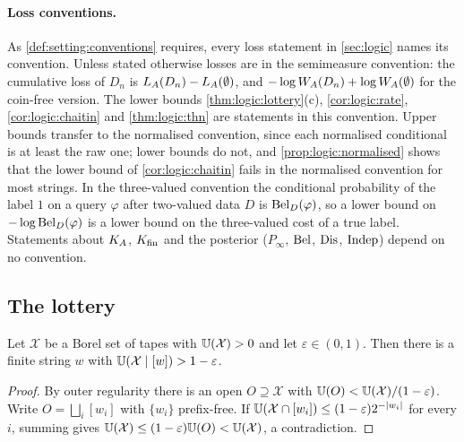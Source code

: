 \paragraph{Loss conventions.} As \cref{def:setting:conventions} requires, every loss statement in \cref{sec:logic} names its convention. Unless stated otherwise losses are in the semimeasure convention: the cumulative loss of $D_n$ is $L_{A}(D_n)-L_{A}(\emptyset)$, and $-\log W_{A}(D_n)+\log W_{A}(\emptyset)$ for the coin-free version. The lower bounds \cref{thm:logic:lottery}(c), \cref{cor:logic:rate}, \cref{cor:logic:chaitin} and \cref{thm:logic:thn} are statements in this convention. Upper bounds transfer to the normalised convention, since each normalised conditional is at least the raw one; lower bounds do not, and \cref{prop:logic:normalised} shows that the lower bound of \cref{cor:logic:chaitin} fails in the normalised convention for most strings. In the three-valued convention the conditional probability of the label $1$ on a query $\varphi$ after two-valued data $D$ is $\mathrm{Bel}_D(\varphi)$, so a lower bound on $-\log\mathrm{Bel}_D(\varphi)$ is a lower bound on the three-valued cost of a true label. Statements about $K_{A}$, $K_{\mathrm{fin}}$ and the posterior ($P_\infty$, $\mathrm{Bel}$, $\mathrm{Dis}$, $\mathrm{Indep}$) depend on no convention.

\subsection{The lottery}\label{app:logic:lottery}

\begin{lemma}\label{lem:logic:density}
Let $\mathcal X$ be a Borel set of tapes with $\mathbb{U}(\mathcal X)>0$ and let $\varepsilon\in(0,1)$. Then there is a finite string $w$ with $\mathbb{U}(\mathcal X\mid[w])>1-\varepsilon$.
\end{lemma}

\begin{proof}
By outer regularity there is an open $O\supseteq\mathcal X$ with $\mathbb{U}(O)<\mathbb{U}(\mathcal X)/(1-\varepsilon)$. Write $O=\bigsqcup_i[w_i]$ with $\{w_i\}$ prefix-free. If $\mathbb{U}(\mathcal X\cap[w_i])\le(1-\varepsilon)2^{-\lvert w_i\rvert}$ for every $i$, summing gives $\mathbb{U}(\mathcal X)\le(1-\varepsilon)\mathbb{U}(O)<\mathbb{U}(\mathcal X)$, a contradiction.
\end{proof}

